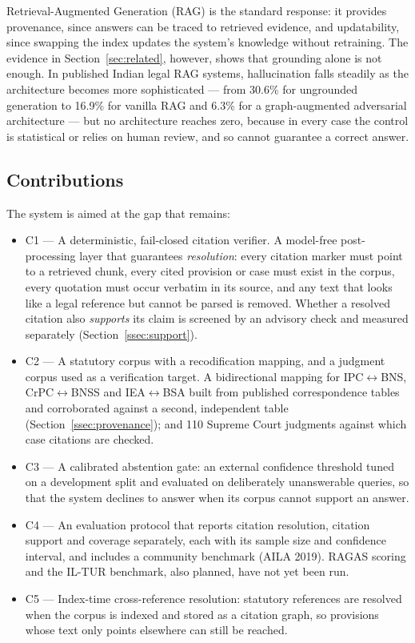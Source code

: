 \documentclass[conference]{IEEEtran}
\begin{document}
Retrieval-Augmented Generation (RAG) \cite{lewis2020} is the standard response: it provides provenance, since answers can be traced to retrieved evidence, and updatability, since swapping the index updates the system's knowledge without retraining. The evidence in Section~\ref{sec:related}, however, shows that grounding alone is not enough. In published Indian legal RAG systems, hallucination falls steadily as the architecture becomes more sophisticated --- from 30.6\% for ungrounded generation to 16.9\% for vanilla RAG and 6.3\% for a graph-augmented adversarial architecture \cite{bindra2026} --- but no architecture reaches zero, because in every case the control is statistical or relies on human review, and so cannot guarantee a correct answer.

\subsection{Contributions}

The system is aimed at the gap that remains:

\begin{itemize}
\item C1 --- A deterministic, fail-closed citation verifier. A model-free post-processing layer that guarantees \emph{resolution}: every citation marker must point to a retrieved chunk, every cited provision or case must exist in the corpus, every quotation must occur verbatim in its source, and any text that looks like a legal reference but cannot be parsed is removed. Whether a resolved citation also \emph{supports} its claim is screened by an advisory check and measured separately (Section~\ref{ssec:support}).
\item C2 --- A statutory corpus with a recodification mapping, and a judgment corpus used as a verification target. A bidirectional mapping for IPC$\leftrightarrow$BNS, CrPC$\leftrightarrow$BNSS and IEA$\leftrightarrow$BSA built from published correspondence tables and corroborated against a second, independent table (Section~\ref{ssec:provenance}); and 110 Supreme Court judgments against which case citations are checked.
\item C3 --- A calibrated abstention gate: an external confidence threshold tuned on a development split and evaluated on deliberately unanswerable queries, so that the system declines to answer when its corpus cannot support an answer.
\item C4 --- An evaluation protocol that reports citation resolution, citation support and coverage separately, each with its sample size and confidence interval, and includes a community benchmark (AILA 2019). RAGAS scoring and the IL-TUR benchmark, also planned, have not yet been run.
\item C5 --- Index-time cross-reference resolution: statutory references are resolved when the corpus is indexed and stored as a citation graph, so provisions whose text only points elsewhere can still be reached.
\end{itemize}
\end{document}
